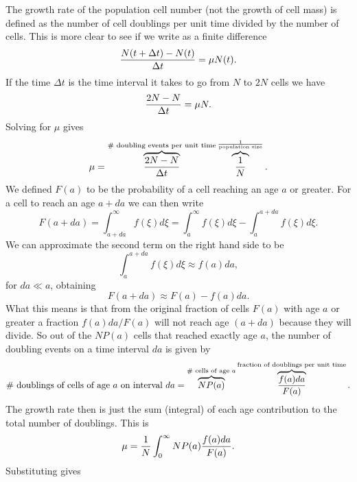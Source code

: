 The growth rate of the population cell number (not the growth of cell mass) is
defined as the number of cell doublings per unit time divided by the number of
cells. This is more clear to see if we write  as a finite
difference
\begin{equation}
  {N(t + \Delta t) - N(t) \over \Delta t} = \mu N(t).
\end{equation}
If the time $\Delta t$ is the time interval it takes to go from $N$ to $2N$
cells we have
\begin{equation}
  {2N - N \over \Delta t} = \mu N.
\end{equation}
Solving for $\mu$ gives
\begin{equation}
  \mu = \overbrace{{2N - N \over \Delta t}}
  ^{\text{\# doubling events per unit time}}
  \overbrace{{1 \over N}}^{{1 \over \text{population size}}}.
\end{equation}
We defined $F(a)$ to be the probability of a cell reaching an age $a$ or
greater. For a cell to reach an age $a + da$ we can then write
\begin{equation}
  F(a + da) = \int_{a + da}^{\infty} f(\xi) d\xi
  = \int_a^{\infty} f(\xi) d\xi - \int_a^{a + da} f(\xi) d\xi.
\end{equation}
We can approximate the second term on the right hand side to be
\begin{equation}
  \int_a^{a + da} f(\xi) d\xi \approx f(a) da,
\end{equation}
for $da \ll a$, obtaining
\begin{equation}
  F(a + da) \approx F(a) - f(a)da.
\end{equation}
What this means is that from the original fraction of cells $F(a)$ with age $a$
or greater a fraction $f(a)da / F(a)$ will not reach age $(a + da)$ because they
will divide. So out of the $NP(a)$ cells that reached exactly age $a$, the
number of doubling events on a time interval $da$ is given by
\begin{equation}
  {\text{\# doublings of cells of age } a {\text{ on interval } da}} =
  \overbrace{NP(a)}^{\text{\# cells of age }a}
  \overbrace{f(a) da \over F(a)}^{\text{fraction of doublings per unit time}}.
\end{equation}
The growth rate then is just the sum (integral) of each age contribution to the
total number of doublings. This is
\begin{equation}
  \mu = {1 \over N} \int_0^\infty NP(a) {f(a)da \over F(a)}.
\end{equation}
Substituting  gives
